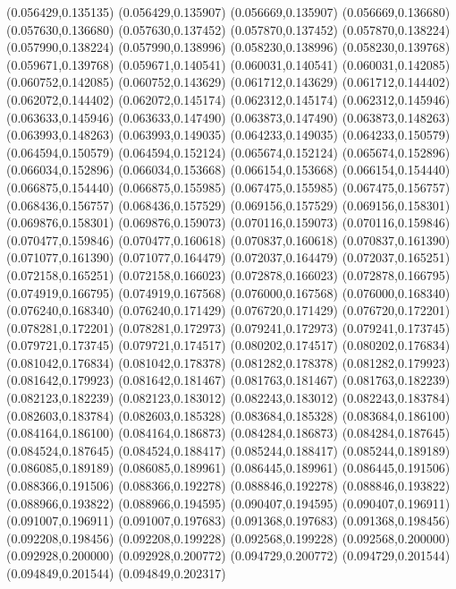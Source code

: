 (0.056429,0.135135)
(0.056429,0.135907)
(0.056669,0.135907)
(0.056669,0.136680)
(0.057630,0.136680)
(0.057630,0.137452)
(0.057870,0.137452)
(0.057870,0.138224)
(0.057990,0.138224)
(0.057990,0.138996)
(0.058230,0.138996)
(0.058230,0.139768)
(0.059671,0.139768)
(0.059671,0.140541)
(0.060031,0.140541)
(0.060031,0.142085)
(0.060752,0.142085)
(0.060752,0.143629)
(0.061712,0.143629)
(0.061712,0.144402)
(0.062072,0.144402)
(0.062072,0.145174)
(0.062312,0.145174)
(0.062312,0.145946)
(0.063633,0.145946)
(0.063633,0.147490)
(0.063873,0.147490)
(0.063873,0.148263)
(0.063993,0.148263)
(0.063993,0.149035)
(0.064233,0.149035)
(0.064233,0.150579)
(0.064594,0.150579)
(0.064594,0.152124)
(0.065674,0.152124)
(0.065674,0.152896)
(0.066034,0.152896)
(0.066034,0.153668)
(0.066154,0.153668)
(0.066154,0.154440)
(0.066875,0.154440)
(0.066875,0.155985)
(0.067475,0.155985)
(0.067475,0.156757)
(0.068436,0.156757)
(0.068436,0.157529)
(0.069156,0.157529)
(0.069156,0.158301)
(0.069876,0.158301)
(0.069876,0.159073)
(0.070116,0.159073)
(0.070116,0.159846)
(0.070477,0.159846)
(0.070477,0.160618)
(0.070837,0.160618)
(0.070837,0.161390)
(0.071077,0.161390)
(0.071077,0.164479)
(0.072037,0.164479)
(0.072037,0.165251)
(0.072158,0.165251)
(0.072158,0.166023)
(0.072878,0.166023)
(0.072878,0.166795)
(0.074919,0.166795)
(0.074919,0.167568)
(0.076000,0.167568)
(0.076000,0.168340)
(0.076240,0.168340)
(0.076240,0.171429)
(0.076720,0.171429)
(0.076720,0.172201)
(0.078281,0.172201)
(0.078281,0.172973)
(0.079241,0.172973)
(0.079241,0.173745)
(0.079721,0.173745)
(0.079721,0.174517)
(0.080202,0.174517)
(0.080202,0.176834)
(0.081042,0.176834)
(0.081042,0.178378)
(0.081282,0.178378)
(0.081282,0.179923)
(0.081642,0.179923)
(0.081642,0.181467)
(0.081763,0.181467)
(0.081763,0.182239)
(0.082123,0.182239)
(0.082123,0.183012)
(0.082243,0.183012)
(0.082243,0.183784)
(0.082603,0.183784)
(0.082603,0.185328)
(0.083684,0.185328)
(0.083684,0.186100)
(0.084164,0.186100)
(0.084164,0.186873)
(0.084284,0.186873)
(0.084284,0.187645)
(0.084524,0.187645)
(0.084524,0.188417)
(0.085244,0.188417)
(0.085244,0.189189)
(0.086085,0.189189)
(0.086085,0.189961)
(0.086445,0.189961)
(0.086445,0.191506)
(0.088366,0.191506)
(0.088366,0.192278)
(0.088846,0.192278)
(0.088846,0.193822)
(0.088966,0.193822)
(0.088966,0.194595)
(0.090407,0.194595)
(0.090407,0.196911)
(0.091007,0.196911)
(0.091007,0.197683)
(0.091368,0.197683)
(0.091368,0.198456)
(0.092208,0.198456)
(0.092208,0.199228)
(0.092568,0.199228)
(0.092568,0.200000)
(0.092928,0.200000)
(0.092928,0.200772)
(0.094729,0.200772)
(0.094729,0.201544)
(0.094849,0.201544)
(0.094849,0.202317)
